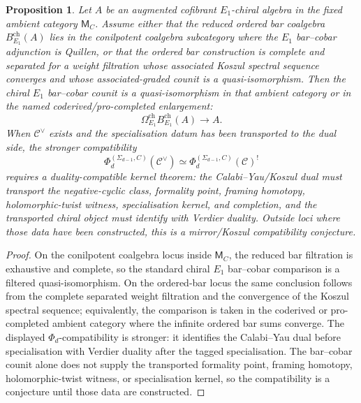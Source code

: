 \documentclass[11pt]{amsart}
\providecommand{\cC}{\mathcal{C}}
\newtheorem{proposition}[theorem]{Proposition}
\theoremstyle{definition}
\theoremstyle{remark}
\begin{document}
\begin{proposition}
Let \(A\) be an augmented cofibrant \(E_1\)-chiral algebra in the fixed
ambient category \(\mathsf{M}_C\). Assume either that the reduced ordered
bar coalgebra \(B^{\mathrm{ch}}_{E_1}(A)\) lies in the conilpotent
coalgebra subcategory where the \(E_1\) bar--cobar adjunction is Quillen,
or that the ordered bar construction is complete and separated for a weight
filtration whose associated Koszul spectral sequence converges and whose
associated-graded counit is a quasi-isomorphism. Then the
chiral \(E_1\) bar--cobar counit is a quasi-isomorphism in that ambient
category or in the named coderived/pro-completed enlargement:
\[
        \Omega^{\mathrm{ch}}_{E_1}B^{\mathrm{ch}}_{E_1}(A)\longrightarrow A .
\]
When \(\cC^\vee\) exists and the specialisation datum has been transported
to the dual side, the stronger
compatibility
\[
        \Phi_d^{(\Sigma_{d-1},C)}(\cC^\vee)
        \simeq
        \Phi_d^{(\Sigma_{d-1},C)}(\cC)^!
\]
requires a duality-compatible kernel theorem: the Calabi--Yau/Koszul dual
must
transport the negative-cyclic class, formality point, framing homotopy,
holomorphic-twist witness, specialisation kernel, and completion, and the
transported chiral object must identify with Verdier duality. Outside loci
where those data have been constructed, this is a mirror/Koszul
compatibility conjecture.
\end{proposition}

\begin{proof}
On the conilpotent coalgebra locus inside \(\mathsf{M}_C\), the reduced bar
filtration is
exhaustive and complete, so the standard chiral \(E_1\) bar--cobar
comparison is a filtered quasi-isomorphism. On the ordered-bar locus the
same conclusion follows from the complete separated weight filtration and
the convergence of the Koszul spectral sequence; equivalently, the
comparison is taken in the coderived or pro-completed ambient category
where the infinite ordered bar sums converge. The displayed
\(\Phi_d\)-compatibility is stronger: it identifies the Calabi--Yau dual
before specialisation with Verdier duality after the tagged
specialisation. The bar--cobar counit alone does not supply the transported
formality point, framing homotopy, holomorphic-twist witness, or
specialisation kernel, so the compatibility is a conjecture until those
data are constructed.
\end{proof}
\end{document}
